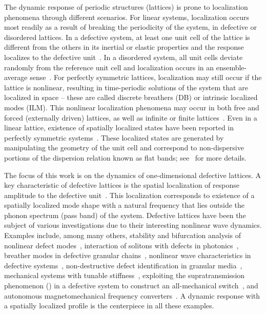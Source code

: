 \documentclass[aps,pre,twocolumn,groupedaddress]{revtex4-1}
\begin{document}
The dynamic response of periodic structures (lattices) is prone to localization phenomena through different scenarios. For linear systems, localization occurs {\color{black}most readily} as a result of breaking the periodicity of the system, in defective or disordered lattices. In a defective system, {\color{black}at least one unit cell of the lattice is different from the others in its inertial or elastic properties} and the response localizes to the defective unit~\cite{defectMontroll}. In a disordered system, {\color{black}all unit cells deviate randomly from the reference unit cell} and localization occurs in an ensemble-average sense~\cite{andersonRev,anderson50,anderson}. For perfectly symmetric lattices, localization may still occur if the lattice is nonlinear, resulting in time-periodic solutions of the system that are localized in space -- these are called discrete breathers (DB) or intrinsic localized modes (ILM). This nonlinear localization phenomena may occur in both free and forced (externally driven) lattices, as well as infinite or finite lattices~\cite{todayDB,DBcolloq,DBchaos}.  
{\color{black}
Even in a linear lattice, existence of spatially localized states have been reported in perfectly symmetric systems~\cite{flatExp1,flatExp2}. These localized states are generated  by manipulating the geometry of the unit cell and correspond to non-dispersive portions of the dispersion relation known as flat bands; see~\cite{flatSimple} for more details. 
}

The focus of this work is on the dynamics of one-dimensional defective lattices. A key characteristic of defective lattices is the spatial localization of response amplitude to the defective unit~\cite{defectMontroll}. This localization corresponds to existence of a spatially localized mode shape with a natural frequency that lies outside the phonon spectrum (pass band) of the system. 
Defective lattices have been the subject of various investigations due to their interesting nonlinear wave dynamics. Examples include, among many others, stability and bifurcation analysis of nonlinear defect modes~\cite{defectBifurcation}, interaction of solitons with defects in photonics~\cite{defectSolitonPhotonics,solitonRevMalomed}, breather modes in defective granular chains~\cite{defectGranularDB,defectGranularJob,defectGranularNick}, nonlinear wave characteristics in defective systems~\cite{masonDefect}, non-destructive defect identification in granular media~\cite{defectNDT}, mechanical systems with tunable stiffness~\cite{chiaraExtreme}, exploiting the supratransmission phenomenon (\cite{supra_00,JSV1}) in a defective system to construct an all-mechanical switch~\cite{nickNature}, and autonomous magnetomechanical frequency converters~\cite{airhockey}. A dynamic response with a spatially localized profile is the centerpiece in all these examples. 
\end{document}
